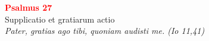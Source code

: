 


\def\greinitialformat#1{%
{\fontsize{39}{39}\selectfont #1}%
}




\vspace{0.3cm}
\begin{center}
 \textcolor{red}{\large \bf Psalmus 27}\\
Supplicatio et gratiarum actio\\
\textit{\small Pater, gratias ago tibi, quoniam audisti me. (Io 11,41)}
\end{center}

